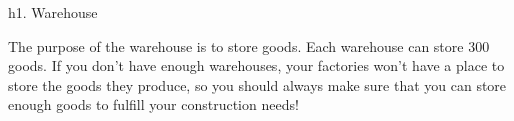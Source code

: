 h1. Warehouse

The purpose of the warehouse is to store goods. Each warehouse can store 300 goods. If you don't have enough warehouses, your factories won't have a place to store the goods they produce, so you should always make sure that you can store enough goods to fulfill your construction needs!